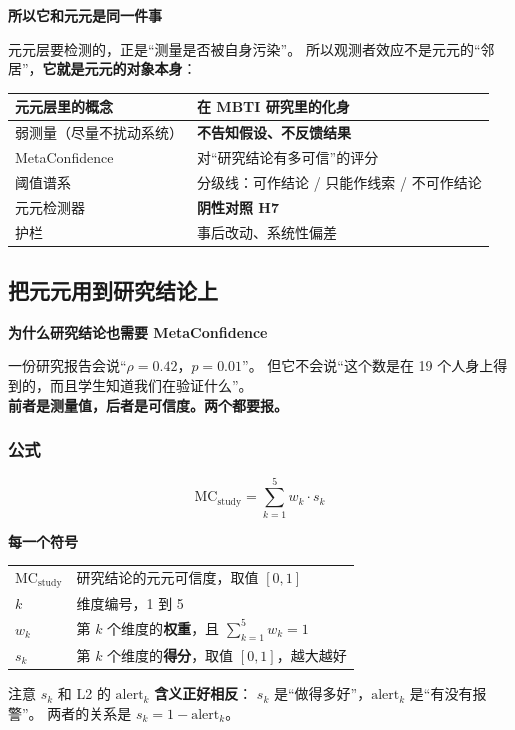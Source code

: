 \documentclass[UTF8,a4paper,11pt]{ctexart}
\newenvironment{explainbox}[1]
{\begin{center}\begin{minipage}{0.94\textwidth}\colorbox{boxbg}{\parbox{0.92\textwidth}{\textbf{#1}\par\vspace{2pt}}}}
{\end{minipage}\end{center}}
\begin{document}
\begin{explainbox}{所以它和元元是同一件事}
元元层要检测的，正是“测量是否被自身污染”。
所以观测者效应不是元元的“邻居”，\textbf{它就是元元的对象本身}：

\begin{center}
\begin{tabular}{p{4.4cm}p{8.8cm}}
\toprule
\textbf{元元层里的概念} & \textbf{在 MBTI 研究里的化身} \\
\midrule
弱测量（尽量不扰动系统） & \textbf{不告知假设、不反馈结果} \\
MetaConfidence & 对“研究结论有多可信”的评分 \\
阈值谱系 & 分级线：可作结论 / 只能作线索 / 不可作结论 \\
元元检测器 & \textbf{阴性对照 H7} \\
护栏 & 事后改动、系统性偏差 \\
\bottomrule
\end{tabular}
\end{center}
\end{explainbox}

\newpage
\subsection{把元元用到研究结论上}

\begin{explainbox}{为什么研究结论也需要 MetaConfidence}
一份研究报告会说“$\rho = 0.42$，$p = 0.01$”。
但它不会说“这个数是在 19 个人身上得到的，而且学生知道我们在验证什么”。\\[4pt]
\textbf{前者是测量值，后者是可信度。两个都要报。}
\end{explainbox}

\subsubsection{公式}

\begin{equation}
\text{MC}_{\text{study}} = \sum_{k=1}^{5} w_k \cdot s_k
\label{p3:eq:mc-study}
\end{equation}

\begin{explainbox}{每一个符号}
\begin{longtable}{@{}p{2.6cm}p{11.2cm}@{}}
$\text{MC}_{\text{study}}$ & 研究结论的元元可信度，取值 $[0,1]$ \\
$k$ & 维度编号，1 到 5 \\
$w_k$ & 第 $k$ 个维度的\textbf{权重}，且 $\sum_{k=1}^{5} w_k = 1$ \\
$s_k$ & 第 $k$ 个维度的\textbf{得分}，取值 $[0,1]$，越大越好 \\
\end{longtable}
注意 $s_k$ 和 L2 的 $\text{alert}_k$ \textbf{含义正好相反}：
$s_k$ 是“做得多好”，$\text{alert}_k$ 是“有没有报警”。
两者的关系是 $s_k = 1 - \text{alert}_k$。
\end{explainbox}
\end{document}
